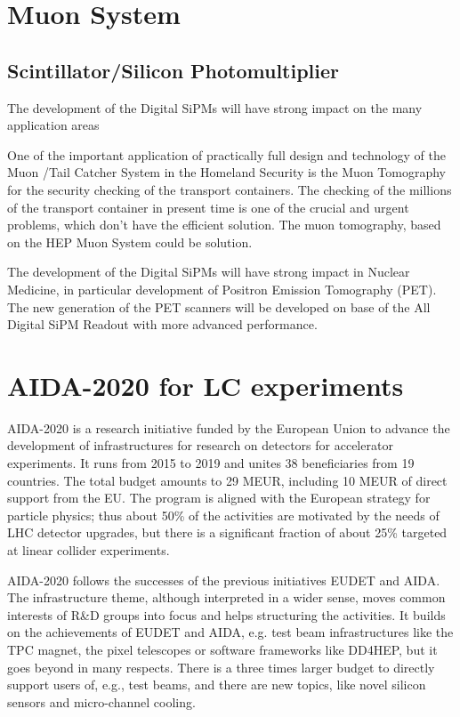 \section{Muon System}
\subsection{Scintillator/Silicon Photomultiplier}
The development of the Digital SiPMs will have strong impact on the many application areas

One of the important application of practically full design and technology of the Muon /Tail Catcher System in the Homeland Security is the Muon Tomography for the security checking of the transport containers. The checking of the millions of the transport container in present time is one of the crucial and urgent problems, which don't have the efficient solution. The muon tomography, based on the HEP Muon System could be solution.

The development of the Digital SiPMs will have strong impact in Nuclear Medicine, in particular development of  Positron Emission Tomography (PET).  The new generation of the PET scanners will be developed on base of the All Digital SiPM Readout with more advanced performance.

\section{AIDA-2020 for LC experiments}
AIDA-2020 is a research initiative funded by the European Union to advance the development of infrastructures for research on detectors for accelerator experiments. It runs from 2015 to 2019 and unites 38 beneficiaries from 19 countries. The total budget amounts to 29 MEUR, including 10 MEUR of direct support from the EU. The program is aligned with the European strategy for particle physics; thus about 50\% of the activities are motivated by the needs of LHC detector upgrades, but there is a significant fraction of about 25\% targeted at linear collider experiments.

AIDA-2020 follows the successes of the previous initiatives EUDET and AIDA. The infrastructure theme, although interpreted in a wider sense, moves common interests of R\&D groups into focus and helps structuring the activities. It builds on the achievements of EUDET and AIDA, e.g. test beam infrastructures like the TPC magnet, the pixel telescopes or software frameworks like DD4HEP, but it goes beyond in many respects. There is a three times larger budget to directly support users of, e.g., test beams, and there are new topics, like novel silicon sensors and micro-channel cooling.

